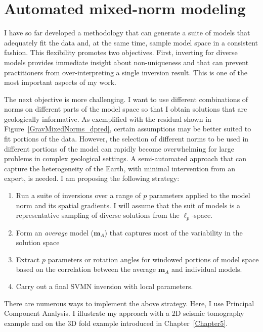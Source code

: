 \graphicspath{{./../Figures/}}
\chapter{Automated mixed-norm modeling}
\label{Chapter6}
I have so far developed a methodology that can generate a suite of models that adequately fit the data and, at the same time, sample model space in a consistent fashion.
This flexibility promotes two objectives.
First, inverting for diverse models provides immediate insight about non-uniqueness and that can prevent practitioners from over-interpreting a single inversion result. This is one of the most important aspects of my work.

The next objective is more challenging. I want to use different combinations of norms on different parts of the model space so that I obtain solutions that are geologically informative.
As exemplified with the residual shown in Figure~\ref{GravMixedNorms_dpred}, certain assumptions may be better suited to fit portions of the data.
However, the selection of different norms to be used in different portions of the model can rapidly become overwhelming for large problems in complex geological settings. A semi-automated approach that can capture the heterogeneity of the Earth, with minimal intervention from an expert, is needed. I am proposing the following strategy:
\begin{enumerate}
\item Run a suite of inversions over a range of $p$ parameters applied to the model norm and its spatial gradients. I will assume that the suit of models is a representative sampling of diverse solutions from the $\ell_p$-space.
\item Form an \emph{average} model ($\mathbf{m}_A$) that captures most of the variability in the solution space
\item Extract $p$ parameters or rotation angles for windowed portions of model space based on the correlation between the average $\mathbf{m}_A$ and individual models.
\item Carry out a final SVMN inversion with local parameters.
\end{enumerate}
There are numerous ways to implement the above strategy. Here, I use Principal Component Analysis. I illustrate my approach with a 2D seismic tomography example and on the 3D fold example introduced in Chapter~\ref{Chapter5}.


